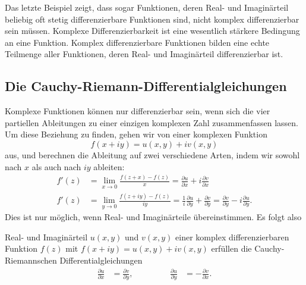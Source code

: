 Das letzte Beispiel zeigt, dass sogar Funktionen, deren Real- und
Imaginärteil beliebig oft stetig differenzierbare Funktionen sind,
nicht komplex differenzierbar sein müssen.
Komplexe Differenzierbarkeit ist eine wesentlich stärkere Bedingung
an eine Funktion.
Komplex differenzierbare Funktionen bilden eine echte Teilmenge
aller Funktionen, deren Real- und Imaginärteil differenzierbar ist.

%
%
\subsection{Die Cauchy-Riemann-Differentialgleichungen}
Komplexe Funktionen können nur differenzierbar sein, wenn sich die vier
partiellen Ableitungen zu einer einzigen komplexen Zahl zusammenfassen
lassen.
Um diese Beziehung zu finden, gehen wir von einer komplexen Funktion
\[
f(x+iy) = u(x,y) + iv(x,y)
\]
aus, und berechnen die Ableitung auf zwei verschiedene Arten, indem
wir sowohl nach $x$ als auch nach $iy$ ableiten:
\begin{align*}
f'(z)&
=
\lim_{x\to 0}\frac{f(z+x)-f(z)}{x}
=
\frac{\partial u}{\partial x}+i\frac{\partial v}{\partial x}
\\
f'(z)&
=
\lim_{y\to 0}\frac{f(z+iy)-f(z)}{iy}
=
\frac1{i}
\frac{\partial u}{\partial y}+\frac{\partial v}{\partial y}
=
\frac{\partial v}{\partial y}
-i
\frac{\partial u}{\partial y}.
\end{align*}
Dies ist nur möglich, wenn Real- und Imaginärteile übereinstimmen.
Es folgt also

\begin{satz}
%
\label{komplex:satz:cauchy-riemann}
Real- und Imaginärteil $u(x,y)$ und $v(x,y)$ einer
komplex differenzierbaren Funktion $f(z)$ mit $f(x+iy)=u(x,y)+iv(x,y)$
erfüllen die Cauchy-Riemannschen Differentialgleichungen
\begin{equation}
\begin{aligned}
\frac{\partial u}{\partial x}
&=
\frac{\partial v}{\partial y},
&&\qquad
&
\frac{\partial u}{\partial y}
&=
-
\frac{\partial v}{\partial x}.
\end{aligned}
\label{komplex:dgl:cauchy-riemann}
\end{equation}
\end{satz}

